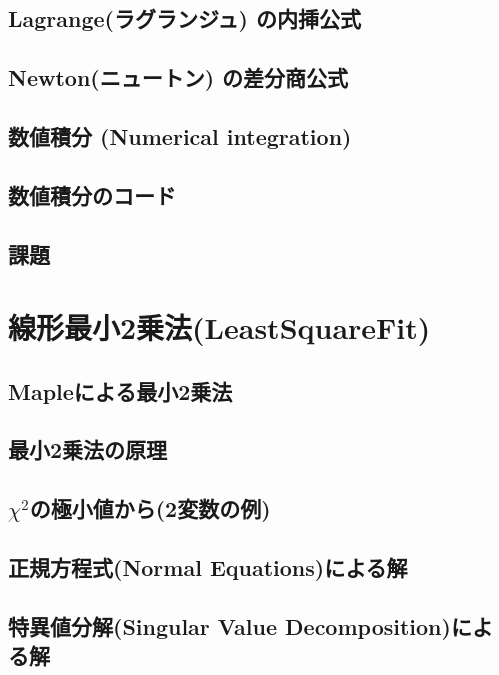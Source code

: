 \section{Lagrange(ラグランジュ) の内挿公式}
 
\section{Newton(ニュートン) の差分商公式}
 
\section{数値積分 (Numerical integration)}
 
\section{数値積分のコード}
 
\section{課題}
 

\chapter{線形最小2乗法(LeastSquareFit)}
\section{Mapleによる最小2乗法}
 
\section{最小2乗法の原理}
 
\section{$\chi^2$の極小値から(2変数の例)}
 
\section{正規方程式(Normal Equations)による解}
 
\section{特異値分解(Singular Value Decomposition)による解}
 
